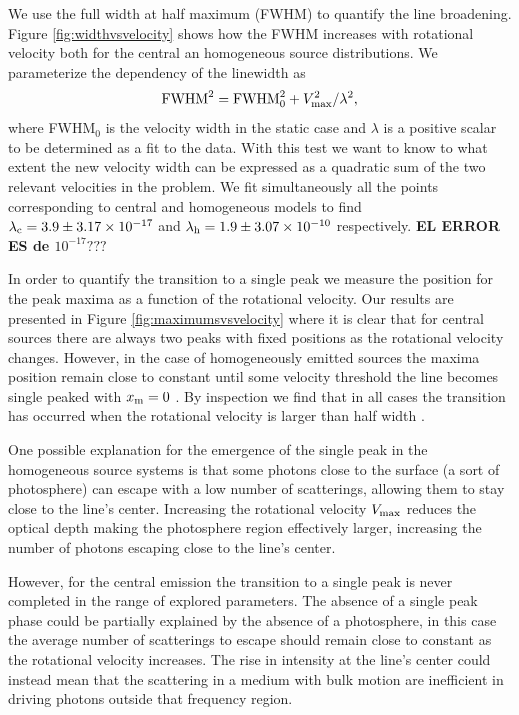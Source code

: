 \documentclass{emulateapj}
\newcommand{\kms}{{\ifmmode{{\mathrm{\,km\ s}^{-1}}}\else{\,km~s$^{-1}$}\fi}}
\begin{document}
We use the full width at half maximum (FWHM) to quantify the line
broadening. Figure \ref{fig:widthvsvelocity} shows how the FWHM increases
with rotational velocity both for the central an homogeneous source
distributions.  We parameterize the dependency of the linewidth as
\begin{equation}
 {\rm FWHM}^2 = {\rm FWHM}_{0}^2 + V_{\rm max}^2/\lambda^2,
\label{eq:fwhm}
\end{equation}
%
where FWHM$_{0}$ is the
velocity width in the static case and $\lambda$ is a positive scalar
to be determined as a fit to the data. With this test we want to know
to what extent the new velocity width can be expressed as a quadratic
sum of the two relevant velocities in the problem. We fit
simultaneously all the points corresponding to central and homogeneous
models to find $\lambda_{\rm c} = 3.9 \pm 3.17\times 10^{-17}$ and $\lambda_{\rm h}=
1.9\pm 3.07\times 10^{-10}$ respectively.  {\bf EL ERROR ES de $10^{-17}???$}

In order to quantify the transition to a single peak we measure the
position for the peak maxima as a function of the rotational
velocity. Our results are presented in Figure
\ref{fig:maximumsvsvelocity} where it is clear that for central
sources there are always two peaks with fixed positions as the rotational
velocity changes. However, in the case of homogeneously emitted
sources the maxima position remain close to constant until some
velocity threshold the line becomes single peaked with $x_{\rm m}=0$
\kms. By inspection we find that in all cases the transition has
occurred when the rotational velocity is larger than half width .

One possible explanation for the emergence of the single peak in the
homogeneous source systems is that some photons close to the surface
(a sort of photosphere) can escape with a low number of scatterings,
allowing them to stay close to the line's center. Increasing the
rotational velocity $V_{\rm max}$ reduces the optical depth making the
photosphere region effectively larger, increasing the number of
photons escaping close to the line's center. 

However, for the central emission the transition to a single peak is
never completed in the range of explored parameters. The absence
of a single peak phase could be partially explained by the absence of a
photosphere, in this case the average number of scatterings to escape
should remain close to constant as the rotational velocity
increases. The rise in intensity at the line's center could instead
mean that the scattering in a medium with bulk motion are inefficient
in driving photons outside that frequency region.
\end{document}
